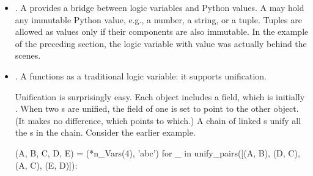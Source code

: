 \begin{itemize}

\item{}. A  provides a bridge between logic variables and Python values. A  may hold any immutable Python value, e.g., a number, a string, or a tuple. Tuples are allowed as  values only if their components are also immutable. In the example of the preceding section, the logic variable  with value  was actually  behind the scenes.
\smallv

\item{}. A  functions as a traditional logic variable: it supports unification. 

Unification is surprisingly easy. Each  object includes a  field, which is initially . When two s are unified, the  field of one is set to point to the other object. (It makes no difference, which points to which.) A chain of linked  s unify all the s in the chain. Consider the earlier example.

\begin{python}
(A, B, C, D, E) = (*n_Vars(4), 'abc')
for _ in unify_pairs([(A, B), (D, C), (A, C), (E, D)]):
\end{python}


\end{itemize}
